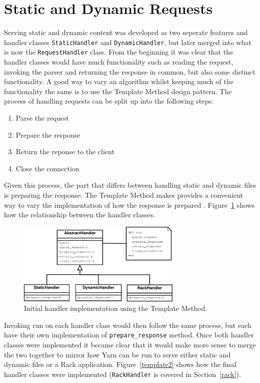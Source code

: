 \section{Static and Dynamic Requests}
Serving static and dynamic content was developed as two seperate features and
handler classes \texttt{StaticHandler} and \texttt{DynamicHandler}, but
later merged into what is now the \texttt{RequestHandler} class. From the
beginning it was clear that the handler classes would have much functionality
such as reading the request, invoking the parser and returning the response in
common, but also some distinct functionality. A good way to vary an algorithm
whilst keeping much of the functionality the same is to use the Template
Method design pattern. The process of handling requests can be split up into
the following steps:

\begin{enumerate}
  \item Parse the request
  \item Prepare the response
  \item Return the reponse to the client
  \item Close the connection
\end{enumerate}

Given this process, the part that differs between handling static and dynamic
files is preparing the response. The Template Method makes provides a
convenient way to vary the implementation of how the response is prepared
\cite{design_patterns}.
Figure~\ref{template} shows how the relationship between the handler classes.

\begin{figure}[htb]
  \centering
  \includegraphics[width=0.7\textwidth]{diagrams/handlers.pdf}
  \caption{Initial handler implementation using the Template Method.}
  \label{template}
\end{figure}

Invoking run on each handler class would then follow the same process, but
each have their own implementation of \texttt{prepare\_response} method. Once
both handler classes were implemented it became clear that it would make more
sense to merge the two together to mirror how Yarn can be run to serve either
static and dynamic files or a Rack application. Figure~\ref{template2} shows
how the final handler classes were implemented (\texttt{RackHandler} is
covered in Section~\ref{rack}).

